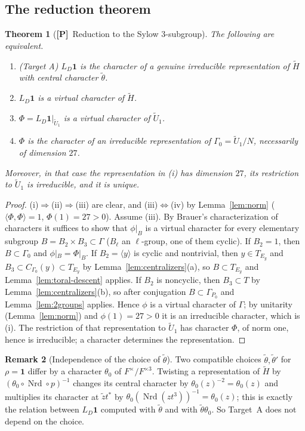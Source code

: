 \documentclass[11pt]{article}
\newcommand{\Nrd}{\operatorname{Nrd}}
\newcommand{\tH}{\widetilde H}
\newcommand{\tU}{\widetilde U}
\newcommand{\tth}{\widetilde\theta}
\newcommand{\Ptag}{\textnormal{\textbf{[P]}}}
\theoremstyle{plain}
\newtheorem{theorem}{Theorem}[section]
\theoremstyle{definition}
\newtheorem{remark}[theorem]{Remark}
\begin{document}
\subsection{The reduction theorem}
\begin{theorem}[\Ptag\ Reduction to the Sylow $3$-subgroup]\label{thm:reduction}
The following are equivalent.
\begin{enumerate}[label=(\roman*)]
\item (Target A) $L_D\mathbf1$ is the character of a genuine irreducible
representation of $\tH$ with central character $\tth$.
\item $L_D\mathbf1$ is a virtual character of $\tH$.
\item $\Phi=L_D\mathbf1|_{\tU_1}$ is a virtual character of $\tU_1$.
\item $\Phi$ is the character of an irreducible representation of
$\Gamma_0=\tU_1/N$, necessarily of dimension $27$.
\end{enumerate}
Moreover, in that case the representation in (i) has dimension $27$,
its restriction to $\tU_1$ is irreducible, and it is unique.
\end{theorem}
\begin{proof}
(i)$\Rightarrow$(ii)$\Rightarrow$(iii) are clear, and (iii)$\Leftrightarrow$(iv)
by Lemma~\ref{lem:norm} ($\langle\Phi,\Phi\rangle=1$, $\Phi(1)=27>0$).
Assume (iii).  By Brauer's characterization of characters it suffices
to show that $\phi|_B$ is a virtual character for every elementary
subgroup $B=B_2\times B_3\subset\Gamma$ ($B_\ell$ an $\ell$-group, one
of them cyclic).  If $B_2=1$, then $B\subset\Gamma_0$ and $\phi|_B=\Phi|_B$.
If $B_2=\langle y\rangle$ is cyclic and nontrivial, then $y\in T_{E_y}$
and $B_3\subset C_{\Gamma_0}(y)\subset T_{E_y}$ by Lemma~\ref{lem:centralizers}(a),
so $B\subset T_{E_y}$ and Lemma~\ref{lem:toral-descent} applies.  If
$B_2$ is noncyclic, then $B_3\subset T$ by Lemma~\ref{lem:centralizers}(b),
so after conjugation $B\subset\Gamma_{P_0}$ and Lemma~\ref{lem:2groups}
applies.  Hence $\phi$ is a virtual character of $\Gamma$; by unitarity
(Lemma~\ref{lem:norm}) and $\phi(1)=27>0$ it is an irreducible
character, which is (i).  The restriction of that representation to
$\tU_1$ has character $\Phi$, of norm one, hence is irreducible; a
character determines the representation.
\end{proof}

\begin{remark}[Independence of the choice of $\tth$]\label{rem:theta-independence}
Two compatible choices $\tth,\tth'$ for $\rho=\mathbf1$ differ by a
character $\theta_0$ of $F^\times/F^{\times3}$.  Twisting a
representation of $\tH$ by $(\theta_0\circ\Nrd\circ p)^{-1}$ changes
its central character by $\theta_0(z)^{-2}=\theta_0(z)$ and multiplies
its character at $\tilde zt^*$ by $\theta_0(\Nrd(zt^3))^{-1}=\theta_0(z)$;
this is exactly the relation between $L_D\mathbf1$ computed with
$\tth$ and with $\tth\theta_0$.  So Target~A does not depend on the
choice.
\end{remark}
\end{document}

